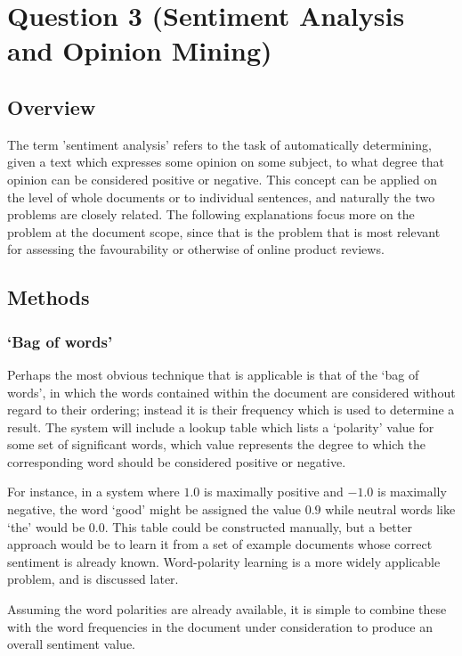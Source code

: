 \documentclass[11pt]{article}
\begin{document}
\section*{Question 3 (Sentiment Analysis and Opinion Mining)}
\subsection*{Overview}
The term 'sentiment analysis' refers to the task of automatically determining,
given a text which expresses some opinion on some subject, to what degree that
opinion can be considered positive or negative. This concept can be applied on
the level of whole documents or to individual sentences, and naturally the two
problems are closely related. The following explanations focus more on the
problem at the document scope, since that is the problem that is most relevant
for assessing the favourability or otherwise of online product reviews.


\subsection*{Methods}

\subsubsection*{`Bag of words'}
Perhaps the most obvious technique that is applicable is that of the `bag of
words', in which the words contained within the document are considered without
regard to their ordering; instead it is their frequency which is used to
determine a result. The system will include a lookup table which lists a
`polarity' value for some set of significant words, which value represents the
degree to which the corresponding word should be considered positive or
negative.

For instance, in a system where $1.0$ is maximally positive and
$-1.0$ is maximally negative, the word `good' might be assigned the value $0.9$
while neutral words like `the' would be $0.0$. This table could be constructed
manually, but a better approach would be to learn it from a set of example
documents whose correct sentiment is already known. Word-polarity learning is a
more widely applicable problem, and is discussed later.

Assuming the word polarities are already available, it is simple to combine these with the word frequencies in the document under consideration to produce an overall sentiment value.
\end{document}

